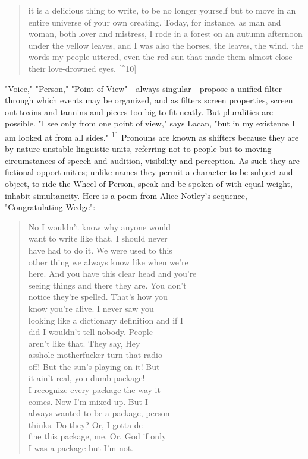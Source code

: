 \documentclass[
]{memoir}
\begin{document}
\begin{quote}
it is a delicious thing to write, to be no longer yourself but to move
in an entire universe of your own creating. Today, for instance, as man
and woman, both lover and mistress, I rode in a forest on an autumn
afternoon under the yellow leaves, and I was also the horses, the
leaves, the wind, the words my people uttered, even the red sun that
made them almost close their love-drowned eyes. {[}\^{}10{]}
\end{quote}

"Voice," "Person," "Point of View"---always singular---propose a unified
filter through which events may be organized, and as filters screen
properties, screen out toxins and tannins and pieces too big to fit
neatly. But pluralities are possible. "I see only from one point of
view," says Lacan, "but in my existence I am looked at from all sides."
\textsuperscript{\protect\hyperlink{WC11}{11}}
\protect\hypertarget{text11}{}{}Pronouns are known as shifters because
they are by nature unstable linguistic units, referring not to people
but to moving circumstances of speech and audition, visibility and
perception. As such they are fictional opportunities; unlike names they
permit a character to be subject and object, to ride the Wheel of
Person, speak and be spoken of with equal weight, inhabit simultaneity.
Here is a poem from Alice Notley's sequence, "Congratulating Wedge":

\begin{verse}
No I wouldn't know why anyone would\\
want to write like that. I should never\\
have had to do it. We were used to this\\
other thing we always know like when we're\\
here. And you have this clear head and you're\\
seeing things and there they are. You don't\\
notice they're spelled. That's how you\\
know you're alive. I never saw you\\
looking like a dictionary definition and if I\\
did I wouldn't tell nobody. People\\
aren't like that. They say, Hey\\
asshole motherfucker turn that radio\\
off! But the sun's playing on it! But\\
it ain't real, you dumb package!\\
I recognize every package the way it\\
comes. Now I'm mixed up. But I\\
always wanted to be a package, person\\
thinks. Do they? Or, I gotta de-\\
fine this package, me. Or, God if only\\
I was a package but I'm not.\\
\end{verse}
\end{document}
